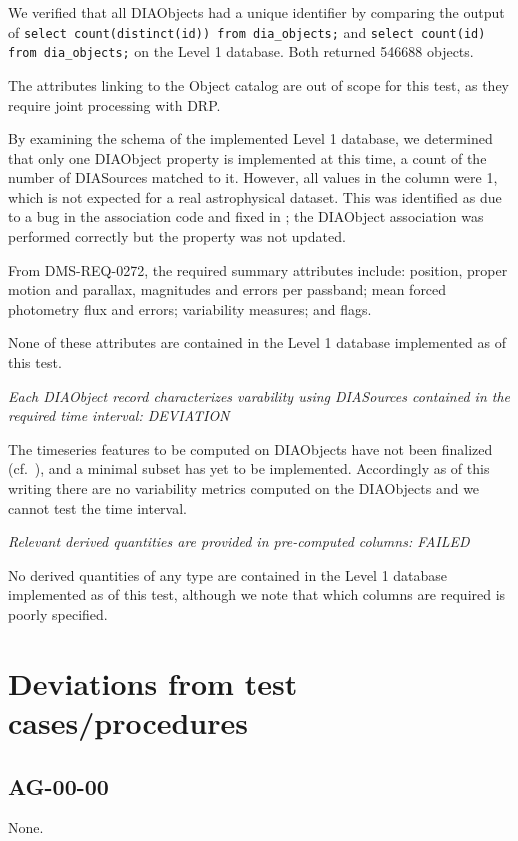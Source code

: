 \documentclass[DM,lsstdraft,STR,toc]{lsstdoc}
\begin{document}
We verified that all DIAObjects had a unique identifier by comparing the 
output of \texttt{select count(distinct(id)) from dia\_objects;} and
\texttt{select count(id) from dia\_objects;} on the Level 1 database.  
Both returned 546688 objects.

The attributes linking to the Object catalog are out of scope for this test, as
they require joint processing with DRP.

By examining the schema of the implemented Level 1 database, we determined that only one DIAObject property is implemented at this time, a count of the number
of DIASources matched to it.  However, all values in the column were 1, which 
is not expected for a real astrophysical dataset.  This was identified as due
to a bug in the association code and fixed in ; the DIAObject 
association was performed correctly but the property was not updated.


From DMS-REQ-0272, the required summary attributes include: 
position, proper motion and parallax, magnitudes and errors per passband; 
mean forced photometry flux and errors; variability measures; and flags.

None of these attributes are contained in the Level 1 database 
implemented as of this test.


\textit{Each DIAObject record characterizes varability using DIASources contained in the required time interval: DEVIATION}

The timeseries features to be computed on DIAObjects have not been finalized
(cf.\ ), and a minimal subset has yet to be implemented.  Accordingly
as of this writing there are no variability metrics computed on the DIAObjects 
and we cannot test the time interval.

\textit{Relevant derived quantities are provided in pre-computed columns: FAILED}

No derived quantities of any type are contained in the Level 1 database 
implemented as of this test, although we note that which
columns are required is poorly specified.

\section{Deviations from test cases/procedures}

\subsection{AG-00-00}

None.
\end{document}
